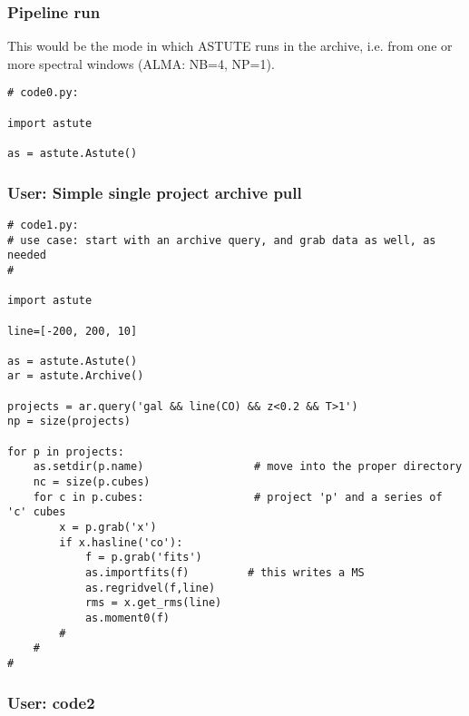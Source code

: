 \documentclass[preprint]{aastex} %
\begin{document}
\subsubsection{Pipeline run}

This would be the mode in which ASTUTE runs in the archive, i.e. from one or more spectral
windows (ALMA: NB=4, NP=1). 

\footnotesize
\begin{verbatim}
# code0.py:

import astute

as = astute.Astute()

\end{verbatim}
\normalsize


\subsubsection{User: Simple single project archive pull}

\footnotesize
\begin{verbatim}
# code1.py:
# use case: start with an archive query, and grab data as well, as needed
#

import astute

line=[-200, 200, 10]

as = astute.Astute()
ar = astute.Archive()

projects = ar.query('gal && line(CO) && z<0.2 && T>1')
np = size(projects)

for p in projects:
    as.setdir(p.name)                 # move into the proper directory
    nc = size(p.cubes)
    for c in p.cubes:                 # project 'p' and a series of 'c' cubes
        x = p.grab('x')
        if x.hasline('co'):
            f = p.grab('fits')
            as.importfits(f)         # this writes a MS
            as.regridvel(f,line)
            rms = x.get_rms(line)
            as.moment0(f)
        #
    #
#

\end{verbatim}
\normalsize


\subsubsection{User: code2}
\end{document}
